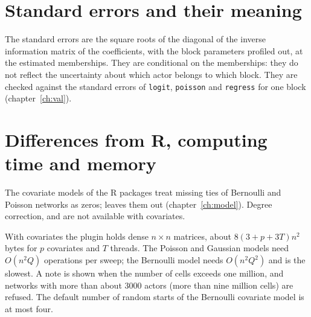 \section{Standard errors and their meaning}
The standard errors are the square roots of the diagonal of the inverse information matrix of the coefficients, with the block parameters profiled out, at the estimated memberships. They are conditional on the memberships: they do not reflect the uncertainty about which actor belongs to which block. They are checked against the standard errors of \texttt{logit}, \texttt{poisson} and \texttt{regress} for one block (chapter~\ref{ch:val}).

\section{Differences from R, computing time and memory}
The covariate models of the R packages treat missing ties of Bernoulli and Poisson networks as zeros; \nwsbm{} leaves them out (chapter~\ref{ch:model}). Degree correction,  and  are not available with covariates.

With covariates the plugin holds dense $n\times n$ matrices, about $8(3+p+3T)n^2$ bytes for $p$ covariates and $T$ threads. The Poisson and Gaussian models need $O(n^2Q)$ operations per sweep; the Bernoulli model needs $O(n^2Q^2)$ and is the slowest. A note is shown when the number of cells exceeds one million, and networks with more than about 3000 actors (more than nine million cells) are refused. The default number of random starts of the Bernoulli covariate model is at most four.

